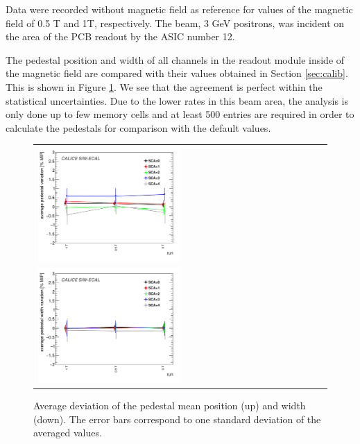 \documentclass[final,3p,times,twocolumn]{elsarticle}
\begin{document}
Data were recorded without magnetic field as reference for values of the magnetic field of 0.5 T and 1T, respectively. 
The beam, 3 GeV positrons, was incident on the area of the PCB readout by the ASIC number 12.

The pedestal position and width of all channels
in the readout module inside of the magnetic field are compared with
their values obtained in Section \ref{sec:calib}.
This is shown in Figure \ref{pedestal_magnetic}.
We see that the agreement is perfect within the statistical uncertainties.
Due to the lower rates in this beam area, the
analysis is only done up to few memory cells and at least 500 entries are required in order to calculate the pedestals
for comparison with the default values.

\begin{figure}[!t]
  \centering
  \begin{tabular}{l}
    \includegraphics[width=0.5\textwidth]{1T_summary_pedestal-eps-converted-to.pdf} \\
    \includegraphics[width=0.5\textwidth]{1T_summary_noise-eps-converted-to.pdf}
  \end{tabular}
  \caption{Average deviation of the pedestal mean position (up) and width (down). The error bars correspond to one standard deviation of the averaged values.}
\label{pedestal_magnetic}
\end{figure}
\end{document}
